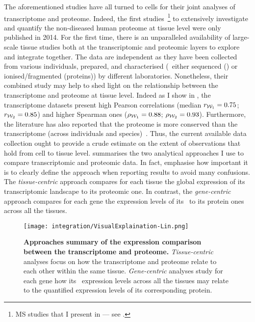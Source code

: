 The aforementioned studies have all turned to cells
for their joint analyses of transcriptome and proteome.
Indeed, the first studies~\footnote{%
MS studies that
I present in  --- see .}
to extensively investigate and quantify
the non-diseased human proteome at tissue level
were only published in 2014.
For the first time,
there is an unparalleled availability of large-scale tissue studies
both at the transcriptomic and proteomic layers to explore and integrate together.
The data are independent
as they have been collected from various individuals, prepared,
and characterised (\ie\ either sequenced (\RNAs)
or ionised/fragmented (proteins))
by different laboratories.
Nonetheless,
their combined study may help
to shed light on the relationship
between the transcriptome and proteome at tissue level.
Indeed as I show in ,
the transcriptome datasets present high Pearson correlations
(median $r_{\mathcal{W}_1}=0.75$; $r_{\mathcal{W}_2}=0.85$)
and higher Spearman ones ($\rho_{\mathcal{W}_1}=0.88$; $\rho_{\mathcal{W}_2}=0.93$).
Furthermore, the literature has also reported that
the proteome is more conserved than the transcriptome
(across individuals and species)~.
Thus, the current available data collection ought to provide
a crude estimate on the extent of observations that hold
from cell to tissue level.
 summarises the two analytical approaches I use
to compare transcriptomic and proteomic data.
In fact,
\citet{Liu2016-re} emphasise how important it is to clearly define
the approach when reporting results to avoid many confusions.
The \emph{tissue-centric} approach compares for each tissue
the global expression of its transcriptomic landscape to its proteomic one.
In contrast,
the \emph{gene-centric} approach compares for each gene
the expression levels of its \mRNA\ to its protein ones across all the tissues.

\begin{figure}
    \texttt{[image: integration/VisualExplaination-Lin.png]}\centering
    \caption[Summary of the expression comparison approaches between
    the transcriptome and proteome]{\label{fig:visualexp}\textbf{Approaches
    summary of the expression comparison between the transcriptome and proteome.}
    \emph{Tissue-centric} analyses focus on
    how the transcriptome and proteome relate to each other within the same tissue.
    \emph{Gene-centric} analyses study for each gene how its \mRNA\ expression
    levels across all the tissues may relate to the quantified expression levels
    of its corresponding protein.
    }
\end{figure}

